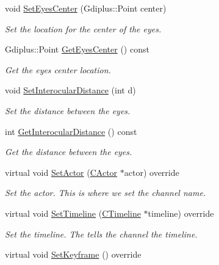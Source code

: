 \begin{DoxyCompactItemize}
void \hyperlink{class_c_head_top_af7e4ce00dae8da5a169da60d43f5c19c}{Set\+Eyes\+Center} (Gdiplus\+::\+Point center)
\begin{DoxyCompactList}\small\item\em Set the location for the center of the eyes. \end{DoxyCompactList}\item 
Gdiplus\+::\+Point \hyperlink{class_c_head_top_aa8686e0e7ac6bb8a1d4a5bf39bbdb076}{Get\+Eyes\+Center} () const 
\begin{DoxyCompactList}\small\item\em Get the eyes center location. \end{DoxyCompactList}\item 
void \hyperlink{class_c_head_top_a8ef7007f2e4f579fc5b06f601234dd5e}{Set\+Interocular\+Distance} (int d)
\begin{DoxyCompactList}\small\item\em Set the distance between the eyes. \end{DoxyCompactList}\item 
int \hyperlink{class_c_head_top_aa180bb1fff39bc753c70e634b5ad36ba}{Get\+Interocular\+Distance} () const 
\begin{DoxyCompactList}\small\item\em Get the distance between the eyes. \end{DoxyCompactList}\item 
virtual void \hyperlink{class_c_head_top_a740ff72a9e96c8407a858079f14f0ad3}{Set\+Actor} (\hyperlink{class_c_actor}{C\+Actor} $\ast$actor) override
\begin{DoxyCompactList}\small\item\em Set the actor. This is where we set the channel name. \end{DoxyCompactList}\item 
virtual void \hyperlink{class_c_head_top_a379aaabd0a8d4a80751341bccc2faeda}{Set\+Timeline} (\hyperlink{class_c_timeline}{C\+Timeline} $\ast$timeline) override
\begin{DoxyCompactList}\small\item\em Set the timeline. The tells the channel the timeline. \end{DoxyCompactList}\item 
\hypertarget{class_c_head_top_aa644db57e1a054733d271eee2d4dbe4a}{virtual void \hyperlink{class_c_head_top_aa644db57e1a054733d271eee2d4dbe4a}{Set\+Keyframe} () override}\label{class_c_head_top_aa644db57e1a054733d271eee2d4dbe4a}


\end{DoxyCompactItemize}
